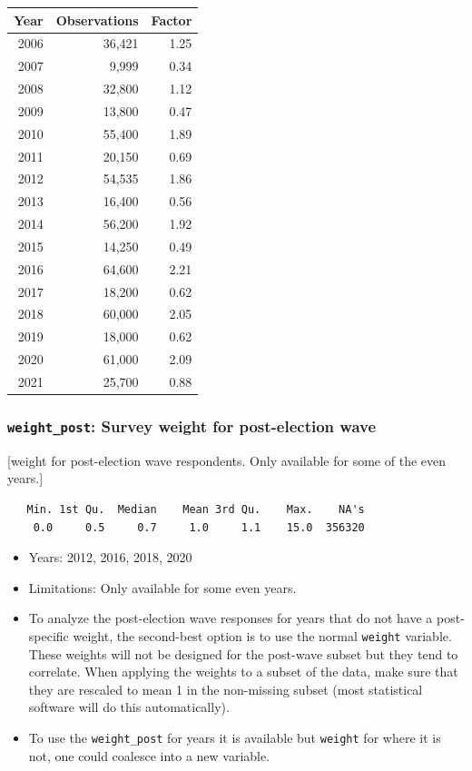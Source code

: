 \documentclass[10pt,article,oneside]{memoir}
\theoremstyle{definition}
\begin{document}
\begin{center}


\begin{tabular}{rrr}
\toprule
Year & Observations & Factor\\
\midrule
2006 & 36,421 & 1.25\\
2007 & 9,999 & 0.34\\
2008 & 32,800 & 1.12\\
2009 & 13,800 & 0.47\\
2010 & 55,400 & 1.89\\
2011 & 20,150 & 0.69\\
2012 & 54,535 & 1.86\\
2013 & 16,400 & 0.56\\
2014 & 56,200 & 1.92\\
2015 & 14,250 & 0.49\\
2016 & 64,600 & 2.21\\
2017 & 18,200 & 0.62\\
2018 & 60,000 & 2.05\\
2019 & 18,000 & 0.62\\
2020 & 61,000 & 2.09\\
2021 & 25,700 & 0.88\\
\bottomrule
\end{tabular}
\end{center}

\hypertarget{weight_post-survey-weight-for-post-election-wave}{%
\subsubsection{\texorpdfstring{\texttt{weight\_post}: Survey weight for
post-election
wave}{weight\_post: Survey weight for post-election wave}}\label{weight_post-survey-weight-for-post-election-wave}}

{[}weight for post-election wave respondents. Only available for some of
the even years.{]}

\begin{verbatim}
   Min. 1st Qu.  Median    Mean 3rd Qu.    Max.    NA's 
    0.0     0.5     0.7     1.0     1.1    15.0  356320 
\end{verbatim}

\begin{itemize}
\tightlist
\item
  Years: 2012, 2016, 2018, 2020
\item
  Limitations: Only available for some even years.
\item
  To analyze the post-election wave responses for years that do not have
  a post-specific weight, the second-best option is to use the normal
  \texttt{weight} variable. These weights will not be designed for the
  post-wave subset but they tend to correlate. When applying the weights
  to a subset of the data, make sure that they are rescaled to mean 1 in
  the non-missing subset (most statistical software will do this
  automatically).
\item
  To use the \texttt{weight\_post} for years it is available but
  \texttt{weight} for where it is not, one could coalesce into a new
  variable.
\end{itemize}
\end{document}
